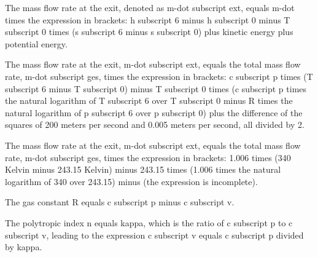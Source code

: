The mass flow rate at the exit, denoted as m-dot subscript ext, equals m-dot times the expression in brackets: h subscript 6 minus h subscript 0 minus T subscript 0 times (s subscript 6 minus s subscript 0) plus kinetic energy plus potential energy.

The mass flow rate at the exit, m-dot subscript ext, equals the total mass flow rate, m-dot subscript ges, times the expression in brackets: c subscript p times (T subscript 6 minus T subscript 0) minus T subscript 0 times (c subscript p times the natural logarithm of T subscript 6 over T subscript 0 minus R times the natural logarithm of p subscript 6 over p subscript 0) plus the difference of the squares of 200 meters per second and 0.005 meters per second, all divided by 2.

The mass flow rate at the exit, m-dot subscript ext, equals the total mass flow rate, m-dot subscript ges, times the expression in brackets: 1.006 times (340 Kelvin minus 243.15 Kelvin) minus 243.15 times (1.006 times the natural logarithm of 340 over 243.15) minus (the expression is incomplete).

The gas constant R equals c subscript p minus c subscript v.

The polytropic index n equals kappa, which is the ratio of c subscript p to c subscript v, leading to the expression c subscript v equals c subscript p divided by kappa.